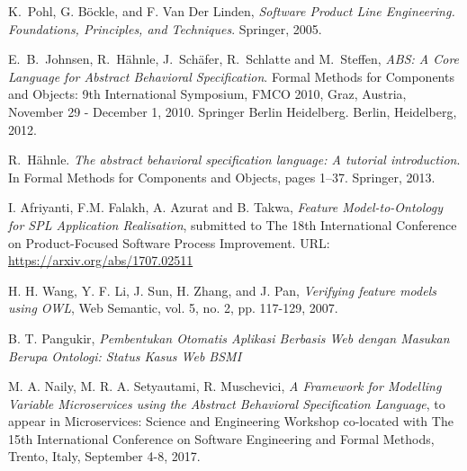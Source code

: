 \documentclass[conference]{IEEEtran}
\begin{document}
%
%
%
\begin{thebibliography}{1}


K.~Pohl, G. B\"{o}ckle, and F. Van Der Linden, \textit{Software Product Line Engineering. Foundations, Principles, and Techniques}. Springer, 2005.

E.~B.~Johnsen, R.~H\"{a}hnle, J.~Sch\"{a}fer, R.~Schlatte and M.~Steffen, \textit{ABS: A Core Language for Abstract Behavioral Specification}. Formal Methods for Components and Objects: 9th International Symposium, FMCO 2010, Graz, Austria, November 29 - December 1, 2010. Springer Berlin Heidelberg. Berlin, Heidelberg, 2012. 

R.~H\"{a}hnle. \textit{The abstract behavioral specification language: A tutorial introduction}.
In Formal Methods for Components and Objects, pages 1–37. Springer, 2013.

I. Afriyanti, F.M. Falakh, A. Azurat and B. Takwa, \textit{Feature Model-to-Ontology for SPL Application Realisation}, submitted to The 18th International Conference on Product-Focused Software Process Improvement. URL: \url{https://arxiv.org/abs/1707.02511}

H. H. Wang, Y. F. Li, J. Sun, H. Zhang, and J. Pan, \textit{Verifying feature models using OWL}, Web Semantic, vol. 5, no. 2, pp. 117-129, 2007.


B. T. Pangukir, \textit{Pembentukan Otomatis Aplikasi Berbasis Web dengan Masukan Berupa Ontologi: Status Kasus Web BSMI}

M. A. Naily, M. R. A. Setyautami, R. Muschevici, \textit{A Framework for Modelling Variable Microservices using the Abstract Behavioral Specification Language}, to appear in Microservices: Science and Engineering Workshop co-located with The 15th International Conference on Software Engineering and Formal Methods, Trento, Italy, September 4-8, 2017. 

\end{thebibliography}

\end{document}
